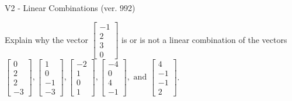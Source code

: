 \begin{exercise}
  \begin{exerciseTitle}V2 - Linear Combinations (ver. 992)\end{exerciseTitle}
  \begin{exerciseStatement}
    Explain why the vector \(\left[\begin{array}{c}
-1 \\
2 \\
3 \\
0
\end{array}\right]\)  is or is not a linear 
	combination of the vectors \(\left[\begin{array}{c}
0 \\
2 \\
2 \\
-3
\end{array}\right] , \left[\begin{array}{c}
1 \\
0 \\
-1 \\
-3
\end{array}\right] , \left[\begin{array}{c}
-2 \\
1 \\
0 \\
1
\end{array}\right] , \left[\begin{array}{c}
-4 \\
0 \\
4 \\
-1
\end{array}\right] , \text{ and } \left[\begin{array}{c}
4 \\
-1 \\
-1 \\
2
\end{array}\right]\).
	



\end{exerciseStatement}
\end{exercise}
